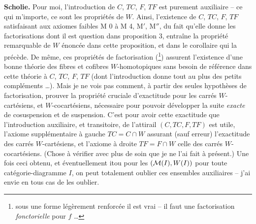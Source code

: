 \textbf{Scholie.} Pour moi, l'introduction de $C$, $TC$, $F$, $TF$ est purement auxiliaire – ce qui m'importe, ce sont les propriétés de $W$. Ainsi, l'existence de $C$, $TC$, $F$, $TF$ satisfaisant aux axiomes faibles M 0 à M 4, M$'$, M$''$, du fait qu'elle donne les factorisations
dont il est question dans proposition 3, entraîne la propriété remarquable de $W$ énoncée dans cette proposition, et dans le corollaire qui la précède. De même, ces propriétés de factorisation (\footnote{sous une forme légèrement renforcée il est vrai – il faut une factorisation \textit{fonctorielle} pour $f$ \dots}) assurent l'existence d'une bonne théorie des fibres et cofibres $W$-homotopiques sans besoin de référence dans cette théorie à $C$, $TC$, $F$, $TF$ (dont l'introduction donne tout au plus des petits compléments \dots). Mais je ne vois pas comment, à partir des seules hypothèses de factorisation, prouver la propriété cruciale d'exactitude pour les carrés $W$-cartésiens, et $W$-cocartésiens, nécessaire pour pouvoir développer la suite \textit{exacte} de cosuspension et de suspension. C'est pour avoir cette exactitude que l'introduction auxiliaire, et transitoire, de l'attirail $(C,TC,F,TF)$ est utile, l'axiome supplémentaire à gauche $TC=C\cap W$ assurant (sauf erreur) l'exactitude des carrés $W$-cartésiens, et l'axiome à droite $TF=F\cap W$ celle des carrés $W$-cocartésiens. (Chose à vérifier avec plus de soin que je ne l'ai fait à présent.) Une fois ceci obtenu, et éventuellement itou pour les $(\mathcal{M}(I),W(I))$ pour toute catégorie-diagramme $I$, on peut
totalement oublier ces ensembles auxiliaires – j'ai envie en tous cas de les oublier.

